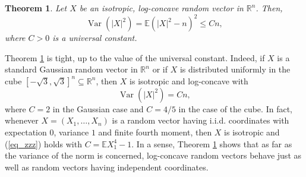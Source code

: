 \documentclass[12pt,a4paper]{article}
\newcommand{\E}{\mathbb{E}}
\newcommand{\EE}{\mathbb{E}}
\newcommand{\RR}{\mathbb{R}}
\newcommand{\var}{\mathop{\mathrm{Var}}\nolimits}
\newtheorem{theorem}{Theorem}[section]
\theoremstyle{definition}
\begin{document}
\begin{theorem}\label{thm1}
Let $X$ be an isotropic, log-concave random vector in $\RR^n$. Then,
\begin{equation} \var(|X|^2) = \EE \left( |X|^2 - n \right)^2 \leq C n, \label{eq_1516} \end{equation}
where $C > 0$ is a universal constant.
\end{theorem}
%
 Theorem \ref{thm1} is tight, up to the value of the universal constant. Indeed, if $X$ is a standard
 Gaussian random vector in $\RR^n$ or if $X$ is distributed uniformly in
 the cube $[-\sqrt{3}, \sqrt{3}]^n \subseteq \RR^n$, then $X$ is isotropic and log-concave with
\begin{equation}\label{eq_zzz}
\var(|X|^2) = C n, 
\end{equation} 
where $C = 2$ in the Gaussian case and $C = 4/5$ in the case of the cube.
In fact, whenever $X = (X_1,\dotsc,X_n)$ is a random vector having 
i.i.d. coordinates with expectation $0$, variance $1$ and finite fourth 
moment, then $X$ is isotropic and (\ref{eq_zzz}) holds with $C = \E X_1^4 -1$. 
In a sense, Theorem \ref{thm1} shows that as far as the variance of the norm 
is concerned, log-concave random vectors behave just as well as 
random vectors having independent coordinates.
  
\end{document}
